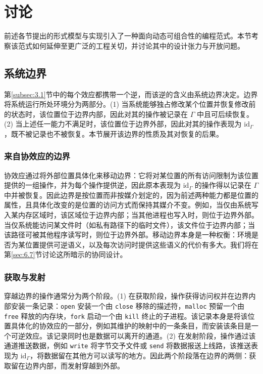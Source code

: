 \section{讨论}\label{sec:6}

前述各节提出的形式模型与实现引入了一种面向动态可组合性的编程范式。本节考察该范式如何延伸至更广泛的工程关切，并讨论其中的设计张力与开放问题。

\subsection{系统边界}\label{sec:6.1}

第\ref{subsec:3.1}节中的每个效应都携带一个逆，而该逆的含义由系统边界决定。边界将系统运行所处环境分为两部分。(1) 当系统能够独占修改某个位置并恢复修改前的状态时，该位置位于边界内部，因此对其的操作被记录在 $\Gamma$ 中且可后续恢复。(2) 当上述任一能力不满足时，该位置位于边界外部，因此对其的操作表现为 $\mathrm{id}_\Gamma$，既不被记录也不被恢复。本节展开该边界的性质及其对恢复的后果。

\subsubsection{来自协效应的边界}

协效应通过将外部位置具体化来移动边界：它将对某位置的所有访问限制为该位置提供的一组操作，并为每个操作提供逆，因此原本表现为 $\mathrm{id}_\Gamma$ 的操作得以记录在 $\Gamma$ 中并被恢复。因此边界是按位置而非按媒介划定的，因为前述两种能力都是位置的属性，且具体化改变的是位置的访问方式而保持其媒介不变。例如，当仅由系统写入某内存区域时，该区域位于边界内部；当其他进程也写入时，则位于边界外部。当仅系统能访问某文件时（如私有路径下的临时文件），该文件位于边界内部；当该路径可被其他程序读写时，则位于边界外部。移动边界本身是一种权衡：环境是否为某位置提供可逆语义，以及每次访问时提供这些语义的代价有多大。我们将在第\ref{sec:6.7}节讨论这所暗示的协同设计。

\subsubsection{获取与发射}

穿越边界的操作通常分为两个阶段。(1) 在获取阶段，操作获得访问权并在边界内部安装一条记录：\texttt{open} 安装一个由 \texttt{close} 移除的描述符，\texttt{malloc} 预留一个由 \texttt{free} 释放的内存块，\texttt{fork} 启动一个由 \texttt{kill} 终止的子进程。该记录本身是将该位置具体化的协效应的一部分，例如其维护的映射中的一条条目，而安装该条目是一个可逆效应。该记录同时也是数据可以离开的通道。(2) 在发射阶段，操作通过该通道推送数据，例如 \texttt{write} 将字节交予文件或 \texttt{send} 将数据报送上线路，该推送表现为 $\mathrm{id}_\Gamma$，将数据留在其他方可以读写的地方。因此两个阶段落在边界的两侧：获取留在边界内部，而发射穿越到外部。


